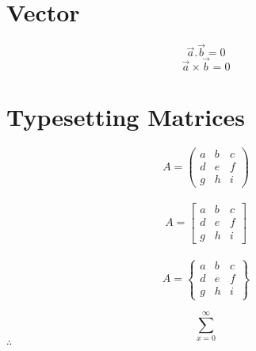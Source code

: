 \documentclass[12pt,a4paper]{report}
\begin{document}
\section{Vector}
$$\overset{\rightarrow}{a}.\overset{\rightarrow}{b}=0$$
$$\overset{\rightarrow}{a}\times\overset{\rightarrow}{b}=0$$

\section{Typesetting Matrices}
$$
A=
\left(
\begin{array}{ccc}
a & b & c\\
d & e & f\\
g & h & i
\end{array}
\right)
$$\\
$$
A=
\left[
\begin{array}{ccc}
a & b & c\\
d & e & f\\
g & h & i
\end{array}
\right]
$$\\
$$
A=
\left\lbrace
\begin{array}{ccc}
a & b & c\\
d & e & f\\
g & h & i
\end{array}
\right\rbrace
$$

$$\sum_{x=0}^{\infty}$$
$\therefore$
\end{document}
